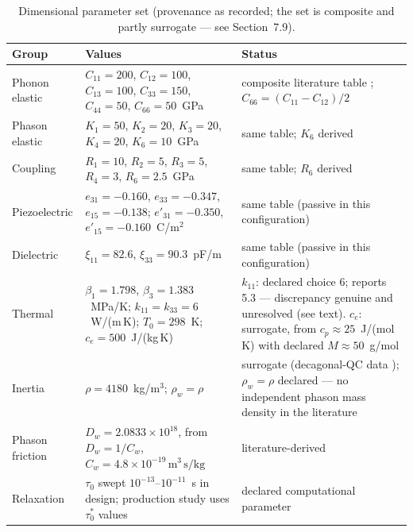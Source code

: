 \documentclass[11pt]{article}
\newcommand{\Dw}{D_w}
\newcommand{\rw}{\rho_w}
\begin{document}
\begin{table}[t]
\centering
\caption{Dimensional parameter set (provenance as recorded; the set is composite and partly surrogate --- see Section~7.9).}
\label{tab:params}
\small
\begin{tabular}{@{}p{2.4cm}p{7.6cm}p{4.6cm}@{}}
\toprule
Group & Values & Status \\
\midrule
Phonon elastic & $C_{11}=200$, $C_{12}=100$, $C_{13}=100$, $C_{33}=150$, $C_{44}=50$, $C_{66}=50$~GPa & composite literature table \cite{wang2021,li2017}; $C_{66}=(C_{11}-C_{12})/2$ \\
Phason elastic & $K_1=50$, $K_2=20$, $K_3=20$, $K_4=20$, $K_6=10$~GPa & same table; $K_6$ derived \\
Coupling & $R_1=10$, $R_2=5$, $R_3=5$, $R_4=3$, $R_6=2.5$~GPa & same table; $R_6$ derived \\
Piezoelectric & $e_{31}=-0.160$, $e_{33}=-0.347$, $e_{15}=-0.138$; $e'_{31}=-0.350$, $e'_{15}=-0.160$~C/m$^2$ & same table (passive in this configuration) \\
Dielectric & $\xi_{11}=82.6$, $\xi_{33}=90.3$~pF/m & same table (passive in this configuration) \\
Thermal & $\beta_1=1.798$, $\beta_3=1.383$~MPa/K; $k_{11}=k_{33}=6$~W/(m\,K); $T_0=298$~K; $c_e=500$~J/(kg\,K) & $k_{11}$: declared choice 6; \cite{li2017} reports 5.3 --- discrepancy genuine and unresolved (see text). $c_e$: surrogate, from $c_p\approx25$~J/(mol\,K) \cite{hosseini2019} with declared $M\approx50$~g/mol \\
Inertia & $\rho=4180$~kg/m$^3$; $\rw=\rho$ & surrogate (decagonal-QC data \cite{hosseini2019,chellappan2015}); $\rw=\rho$ declared --- no independent phason mass density in the literature \\
Phason friction & $\Dw=2.0833\times10^{18}$, from $\Dw=1/C_w$, $C_w=4.8\times10^{-19}\,\mathrm{m^3\,s/kg}$ \cite{chellappan2015} & literature-derived \\
Relaxation & $\tau_0$ swept $10^{-13}$--$10^{-11}$~s in design; production study uses $\tau_0^*$ values & declared computational parameter \\
\bottomrule
\end{tabular}
\end{table}
\end{document}
